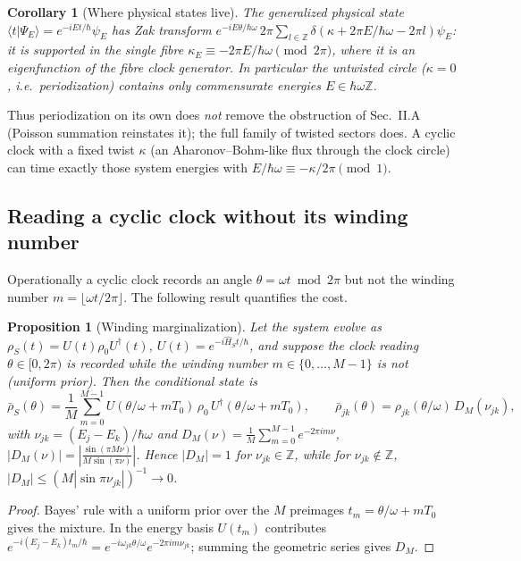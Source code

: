 \documentclass[aps,prd,onecolumn,notitlepage,10pt,amsmath,amssymb,amsfonts,nofootinbib]{revtex4-2}
\newtheorem{proposition}{Proposition}
\newtheorem{corollary}{Corollary}
\theoremstyle{definition}
\theoremstyle{remark}
\newcommand{\Hs}{\widehat{H}_S}
\newcommand{\Z}{\mathbb{Z}}
\begin{document}
\begin{corollary}[Where physical states live]
\label{cor:fibres}
The generalized physical state $\langle t|\Psi_E\rangle=e^{-iEt/\hbar}\psi_E$ has Zak transform
$e^{-iE\theta/\hbar\omega}\,2\pi\sum_{l\in\Z}\delta\!\left(\kappa+2\pi E/\hbar\omega-2\pi l\right)\psi_E$: it is supported in the single fibre $\kappa_E\equiv-2\pi E/\hbar\omega\pmod{2\pi}$, where it is an eigenfunction of the fibre clock generator. In particular the untwisted circle ($\kappa=0$, i.e.\ periodization) contains only commensurate energies $E\in\hbar\omega\Z$.
\end{corollary}

Thus periodization on its own does \emph{not} remove the obstruction of Sec.~II.A (Poisson summation reinstates it); the full family of twisted sectors does. A cyclic clock with a fixed twist $\kappa$ (an Aharonov--Bohm-like flux through the clock circle) can time exactly those system energies with $E/\hbar\omega\equiv-\kappa/2\pi \pmod 1$.

\subsection{Reading a cyclic clock without its winding number}
Operationally a cyclic clock records an angle $\theta=\omega t \bmod 2\pi$ but not the winding number $m=\lfloor\omega t/2\pi\rfloor$. The following result quantifies the cost.

\begin{proposition}[Winding marginalization]
\label{prop:winding}
Let the system evolve as $\rho_S(t)=U(t)\rho_0U^\dagger(t)$, $U(t)=e^{-i\Hs t/\hbar}$, and suppose the clock reading $\theta\in[0,2\pi)$ is recorded while the winding number $m\in\{0,\dots,M-1\}$ is not (uniform prior). Then the conditional state is
\begin{equation}
  \bar\rho_S(\theta)=\frac1M\sum_{m=0}^{M-1}U(\theta/\omega+mT_0)\,\rho_0\,U^\dagger(\theta/\omega+mT_0),\qquad
  \bar\rho_{jk}(\theta)=\rho_{jk}(\theta/\omega)\,D_M(\nu_{jk}),
  \label{eq:winding}
\end{equation}
with $\nu_{jk}=(E_j-E_k)/\hbar\omega$ and $D_M(\nu)=\frac1M\sum_{m=0}^{M-1}e^{-2\pi im\nu}$, $|D_M(\nu)|=\left|\frac{\sin(\pi M\nu)}{M\sin(\pi\nu)}\right|$. Hence $|D_M|=1$ for $\nu_{jk}\in\Z$, while for $\nu_{jk}\notin\Z$, $|D_M|\le\left(M|\sin\pi\nu_{jk}|\right)^{-1}\to0$.
\end{proposition}

\begin{proof}
Bayes' rule with a uniform prior over the $M$ preimages $t_m=\theta/\omega+mT_0$ gives the mixture. In the energy basis $U(t_m)$ contributes $e^{-i(E_j-E_k)t_m/\hbar}=e^{-i\omega_{jk}\theta/\omega}e^{-2\pi i m\nu_{jk}}$; summing the geometric series gives $D_M$.
\end{proof}
\end{document}
